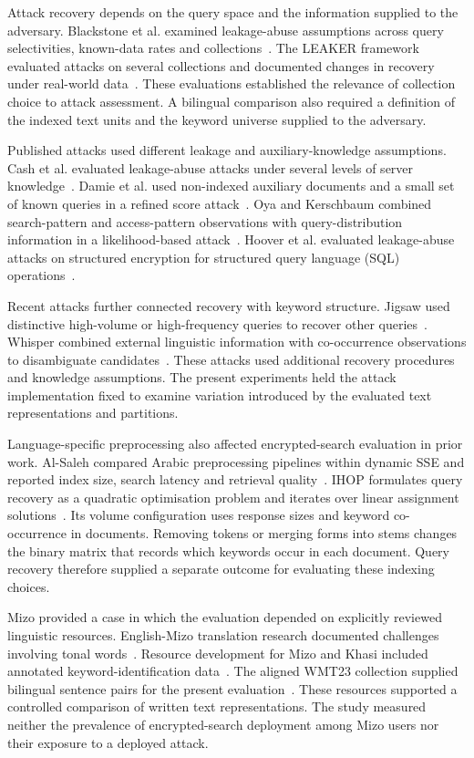 \documentclass[pdflatex,sn-mathphys-num]{sn-jnl}%
\theoremstyle{thmstyleone}%
\theoremstyle{thmstyletwo}%
\theoremstyle{thmstylethree}%
\begin{document}
Attack recovery depends on the query space and the information supplied to the adversary. Blackstone et al. examined leakage-abuse assumptions across query selectivities, known-data rates and collections~\cite{blackstone}. The LEAKER framework evaluated attacks on several collections and documented changes in recovery under real-world data~\cite{leaker}. These evaluations established the relevance of collection choice to attack assessment. A bilingual comparison also required a definition of the indexed text units and the keyword universe supplied to the adversary.

Published attacks used different leakage and auxiliary-knowledge assumptions. Cash et al. evaluated leakage-abuse attacks under several levels of server knowledge~\cite{cash}. Damie et al. used non-indexed auxiliary documents and a small set of known queries in a refined score attack~\cite{damie}. Oya and Kerschbaum combined search-pattern and access-pattern observations with query-distribution information in a likelihood-based attack~\cite{sap}. Hoover et al. evaluated leakage-abuse attacks on structured encryption for structured query language (SQL) operations~\cite{hoover}.

Recent attacks further connected recovery with keyword structure. Jigsaw used distinctive high-volume or high-frequency queries to recover other queries~\cite{jigsaw}. Whisper combined external linguistic information with co-occurrence observations to disambiguate candidates~\cite{whisper}. These attacks used additional recovery procedures and knowledge assumptions. The present experiments held the attack implementation fixed to examine variation introduced by the evaluated text representations and partitions.

Language-specific preprocessing also affected encrypted-search evaluation in prior work. Al-Saleh compared Arabic preprocessing pipelines within dynamic SSE and reported index size, search latency and retrieval quality~\cite{arabic}. IHOP formulates query recovery as a quadratic optimisation problem and iterates over linear assignment solutions~\cite{ihop}. Its volume configuration uses response sizes and keyword co-occurrence in documents. Removing tokens or merging forms into stems changes the binary matrix that records which keywords occur in each document. Query recovery therefore supplied a separate outcome for evaluating these indexing choices.

Mizo provided a case in which the evaluation depended on explicitly reviewed linguistic resources. English-Mizo translation research documented challenges involving tonal words~\cite{mizotone}. Resource development for Mizo and Khasi included annotated keyword-identification data~\cite{mizoresources}. The aligned WMT23 collection supplied bilingual sentence pairs for the present evaluation~\cite{indic}. These resources supported a controlled comparison of written text representations. The study measured neither the prevalence of encrypted-search deployment among Mizo users nor their exposure to a deployed attack.
\end{document}
